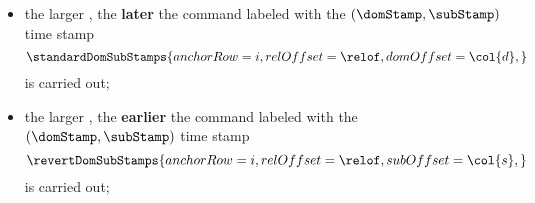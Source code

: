 \begin{itemize}
	\item the larger , the \textbf{later} the command labeled with the $(\domStamp, \subStamp)$ time stamp
		\[ 
			\standardDomSubStamps {
				anchorRow = i       ,
				relOffset = \relof  ,
				domOffset = \col{d} ,
			}
		\]
		is carried out;
	\item the larger , the \textbf{earlier} the command labeled with the $(\domStamp, \subStamp)$ time stamp
		\[ 
		\revertDomSubStamps {
			anchorRow = i       ,
			relOffset = \relof  ,
			subOffset = \col{s} ,
		}
		\]
		is carried out;
\end{itemize}
